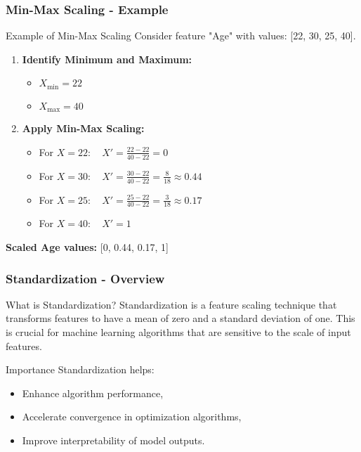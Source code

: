 \documentclass[aspectratio=169]{beamer}
\begin{document}
\begin{frame}[fragile]
    \frametitle{Min-Max Scaling - Example}
    \begin{block}{Example of Min-Max Scaling}
        Consider feature "Age" with values: [22, 30, 25, 40].
        
        \begin{enumerate}
            \item \textbf{Identify Minimum and Maximum:}
                \begin{itemize}
                    \item \( X_{\text{min}} = 22 \)
                    \item \( X_{\text{max}} = 40 \)
                \end{itemize}
            \item \textbf{Apply Min-Max Scaling:}
                \begin{itemize}
                    \item For \( X = 22: \quad X' = \frac{22 - 22}{40 - 22} = 0 \)
                    \item For \( X = 30: \quad X' = \frac{30 - 22}{40 - 22} = \frac{8}{18} \approx 0.44 \)
                    \item For \( X = 25: \quad X' = \frac{25 - 22}{40 - 22} = \frac{3}{18} \approx 0.17 \)
                    \item For \( X = 40: \quad X' = 1 \)
                \end{itemize}
        \end{enumerate}
        
        \textbf{Scaled Age values:} [0, 0.44, 0.17, 1]
    \end{block}
\end{frame}

\begin{frame}[fragile]
    \frametitle{Standardization - Overview}
    \begin{block}{What is Standardization?}
        Standardization is a feature scaling technique that transforms features to have a mean of zero and a standard deviation of one. 
        This is crucial for machine learning algorithms that are sensitive to the scale of input features.
    \end{block}

    \begin{block}{Importance}
        Standardization helps:
        \begin{itemize}
            \item Enhance algorithm performance,
            \item Accelerate convergence in optimization algorithms,
            \item Improve interpretability of model outputs.
        \end{itemize}
    \end{block}
\end{frame}
\end{document}
